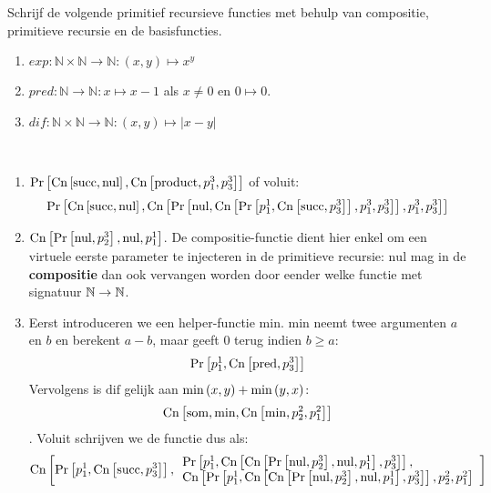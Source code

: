 \documentclass[a4paper]{article}
\newcommand{\prnul}[0]{\ensuremath{\mbox{nul}}}
\newcommand{\prsucc}[0]{\ensuremath{\mbox{succ}}}
\newcommand{\prp}[2]{\ensuremath{p_{#2}^{#1}}}
\newcommand{\prcn}[2]{\funmf{Cn}{#1,#2}}
\newcommand{\prpr}[2]{\funmf{Pr}{#1,#2}}
\newcommand{\N}{\mathbb{N}}
\begin{document}
\begin{question}
Schrijf de volgende primitief recursieve functies met behulp van compositie, primitieve recursie en de basisfuncties.
\begin{enumerate}
  \item $exp : \N \times \N \to \N : (x,y) \mapsto x^y$
  \item $pred : \N \to \N : x \mapsto x - 1$ als $x \neq 0$ en $0 \mapsto 0$.
  \item $dif : \N \times \N \to \N : (x,y) \mapsto | x - y |$
\end{enumerate}
\begin{answer}~~
\begin{enumerate}
 \item $\prpr{\prcn{\prsucc}{\prnul}}{\prcn{\mbox{product}}{\prp{3}{1},\prp{3}{3}}}$ of voluit: \begin{equation}\prpr{\prcn{\prsucc}{\prnul}}{\prcn{\prpr{\prnul}{\prcn{\prpr{\prp{1}{1}}{\prcn{\prsucc}{\prp{3}{3}}}}{\prp{3}{1},\prp{3}{3}}}}{\prp{3}{1},\prp{3}{3}}}\end{equation}
 \item $\prcn{\prpr{\prnul}{\prp{3}{2}}}{\prnul,\prp{1}{1}}$. De compositie-functie dient hier enkel om een virtuele eerste parameter te injecteren in de primitieve recursie: $\prnul$ mag in de \textbf{compositie} dan ook vervangen worden door eender welke functie met signatuur $\mathbb{N}\rightarrow\mathbb{N}$.
 \item Eerst introduceren we een helper-functie $\mbox{min}$. $\mbox{min}$ neemt twee argumenten $a$ en $b$ en berekent $a-b$, maar geeft $0$ terug indien $b\geq a$:\begin{equation}\prpr{\prp{1}{1}}{\prcn{\mbox{pred}}{\prp{3}{3}}}\end{equation}
 Vervolgens is $\mbox{dif}$ gelijk aan $\mbox{min}\left( x,y \right)+\mbox{min}\left( y,x \right)$:\begin{equation}\prcn{\mbox{som}}{\mbox{min},\prcn{\mbox{min}}{\prp{2}{2},\prp{2}{1}}}\end{equation}. Voluit schrijven we de functie dus als:
 \begin{equation}
  \prcn{\prpr{\prp11}{\prcn{\prsucc}{\prp33}}}{\begin{array}{l}\prpr{\prp{1}{1}}{\prcn{\prcn{\prpr{\prnul}{\prp{3}{2}}}{\prnul,\prp{1}{1}}}{\prp{3}{3}}},\\\prcn{\prpr{\prp{1}{1}}{\prcn{\prcn{\prpr{\prnul}{\prp{3}{2}}}{\prnul,\prp{1}{1}}}{\prp{3}{3}}}}{\prp{2}{2},\prp{2}{1}}\end{array}}
 \end{equation}
\end{enumerate}
\end{answer}
\end{question}
\end{document}
